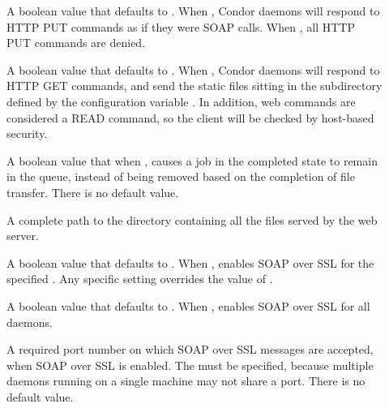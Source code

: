 \begin{description}

\item[]
  \label{param:EnableSoap}
  A boolean value that defaults to .
  When , Condor daemons will respond to HTTP PUT commands
  as if they were SOAP calls. When ,
  all HTTP PUT commands are denied.

\item[]
  \label{param:EnableWebServer}
  A boolean value that defaults to .
  When , Condor daemons will respond to HTTP GET commands,
  and send the static files sitting in the subdirectory defined
  by the configuration variable .
  In addition, web commands are considered a READ command,
  so the client will be checked by host-based security.

\item[]
  \label{param:SoapLeaveInQueue}
  A boolean value that when ,
  causes a job in the completed state to remain in the queue,
  instead of being removed based on the completion of file transfer.
  There is no default value.

\item[]
  \label{param:WebRootDir}
  A complete path to the directory containing all the files served
  by the web server.

\item[]
  \label{param:SubsysEnableSoapSSL}
  A boolean value that defaults to .
  When , enables SOAP over SSL for the specified
  .
  Any specific  setting overrides
  the value of .

\item[]
  \label{param:EnableSoapSSL}
  A boolean value that defaults to .
  When , enables SOAP over SSL for all daemons.

\item[]
  \label{param:SubsysSoapSSLPort}
  A required port number on which SOAP over SSL messages are
  accepted, when SOAP over SSL is enabled.
  The  must be specified, because multiple daemons
  running on a single machine may not share a port.
  There is no default value.


\end{description}
